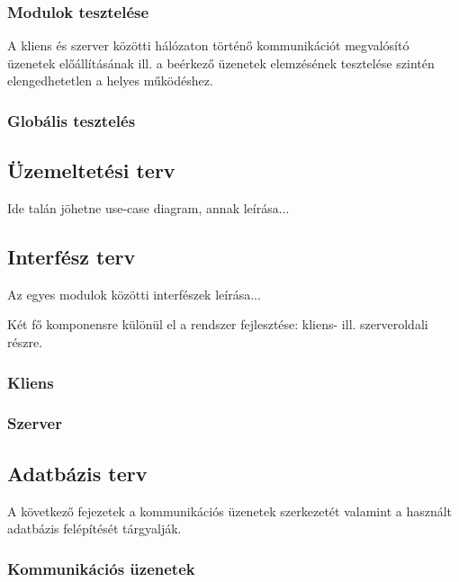 \subsubsection{Modulok tesztelése}

A kliens és szerver közötti hálózaton történő kommunikációt megvalósító üzenetek előállításának ill. a beérkező üzenetek elemzésének tesztelése szintén elengedhetetlen a helyes működéshez.

\subsubsection{Globális tesztelés}

\subsection{Üzemeltetési terv}
\label{sec:uzemeltetesi_terv}

Ide talán jöhetne use-case diagram, annak leírása...

\subsection{Interfész terv}
\label{sec:interfesz_terv}

Az egyes modulok közötti interfészek leírása...

Két fő komponensre különül el a rendszer fejlesztése: kliens-
ill. szerveroldali részre.

\subsubsection{Kliens}
\label{sec:kliensinterfesz}

\subsubsection{Szerver}
\label{sec:szerverinterfesz}

\subsection{Adatbázis terv}

A következő fejezetek a kommunikációs üzenetek szerkezetét valamint a használt adatbázis felépítését tárgyalják.


\subsubsection{Kommunikációs üzenetek}
\label{sec:kommuzenetek}

